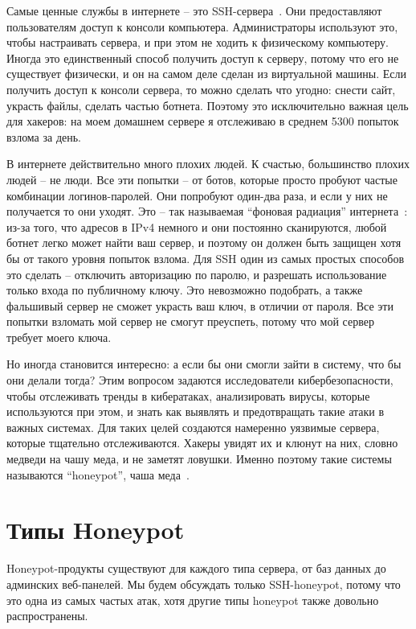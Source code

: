 \documentclass[a4page]{article}
\begin{document}
Самые ценные службы в интернете – это SSH-сервера~\cite{ssh-risk-monitoring}. Они предоставляют пользователям доступ к консоли компьютера. Администраторы используют это, чтобы настраивать сервера, и при этом не ходить к физическому компьютеру. Иногда это единственный способ получить доступ к серверу, потому что его не существует физически, и он на самом деле сделан из виртуальной машины. Если получить доступ к консоли сервера, то можно сделать что угодно: снести сайт, украсть файлы, сделать частью ботнета. Поэтому это исключительно важная цель для хакеров: на моем домашнем сервере я отслеживаю в среднем 5300 попыток взлома за день.

В интернете действительно много плохих людей. К счастью, большинство плохих людей – не люди. Все эти попытки – от ботов, которые просто пробуют частые комбинации логинов-паролей. Они попробуют один-два раза, и если у них не получается то они уходят. Это – так называемая “фоновая радиация” интернета~\cite{enwiki:1188601229}: из-за того, что адресов в IPv4 немного и они постоянно сканируются, любой ботнет легко может найти ваш сервер, и поэтому он должен быть защищен хотя бы от такого уровня попыток взлома. Для SSH один из самых простых способов это сделать – отключить авторизацию по паролю, и разрешать использование только входа по публичному ключу. Это невозможно подобрать, а также фальшивый сервер не сможет украсть ваш ключ, в отличии от пароля. Все эти попытки взломать мой сервер не смогут преуспеть, потому что мой сервер требует моего ключа.

Но иногда становится интересно: а если бы они смогли зайти в систему, что бы они делали тогда? Этим вопросом задаются исследователи кибербезопасности, чтобы отслеживать тренды в кибератаках, анализировать вирусы, которые используются при этом, и знать как выявлять и предотвращать такие атаки в важных системах. Для таких целей создаются намеренно уязвимые сервера, которые тщательно отслеживаются.  Хакеры увидят их и клюнут на них, словно медведи на чашу меда, и не заметят ловушки. Именно поэтому такие системы называются “honeypot”, чаша меда~\cite{what-honeypot}.

\section{Типы Honeypot}
Honeypot-продукты существуют для каждого типа сервера, от баз данных до админских веб-панелей. Мы будем обсуждать только SSH-honeypot, потому что это одна из самых частых атак, хотя другие типы honeypot также довольно распространены.
\end{document}
